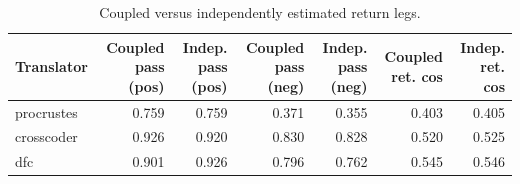 \begin{table}[t]
\centering
\small
\begin{tabular}{lrrrrrr}
\toprule
Translator & Coupled pass (pos) & Indep. pass (pos) & Coupled pass (neg) & Indep. pass (neg) & Coupled ret. cos & Indep. ret. cos \\
\midrule
procrustes & 0.759 & 0.759 & 0.371 & 0.355 & 0.403 & 0.405 \\
crosscoder & 0.926 & 0.920 & 0.830 & 0.828 & 0.520 & 0.525 \\
dfc & 0.901 & 0.926 & 0.796 & 0.762 & 0.545 & 0.546 \\
\bottomrule
\end{tabular}
\caption{Coupled versus independently estimated return legs.}
\label{tab:coupled_vs_independent}
\end{table}